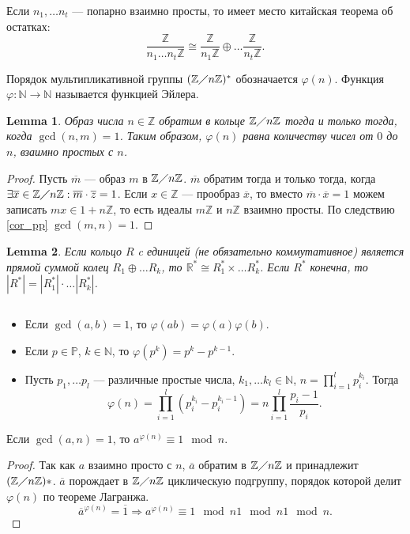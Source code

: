 \documentclass[11pt]{book}
\newcommand{\Z}{\mathbb{Z}}
\newcommand{\N}{\mathbb{N}}
\newcommand{\R}{\mathbb{R}}
\newcommand{\Pm}{\mathbb{P}}
\newcommand{\po}{\diagup}
\theoremstyle{definition}
\theoremstyle{plain}
\theoremstyle{plain}
\newtheorem{lm}{Lemma}
\theoremstyle{definition}
\theoremstyle{remark}
\begin{document}
 Если $ n_1, \ldots n_t$ --- попарно взаимно просты, то имеет место китайская теорема об остатках:
 \[
     \frac{\Z}{n_1 \ldots n_t\Z} \cong \frac{\Z}{n_1\Z} \oplus \ldots \frac{\Z}{n_t\Z}
 .\] 
 \begin{defn}
     Порядок мультипликативной группы $ (\Z \po n\Z)^{*}$ обозначается $ \varphi (n)$. Функция $ \varphi :\N \to  \N$ называется {\sf функцией Эйлера}.
 \end{defn}
 \begin{lm}
     Образ числа $ n \in \Z$ обратим в кольце $ \Z \po n\Z$  тогда и только тогда, когда $ \gcd (n,m) = 1$. Таким образом,  $ \varphi (n)$ равна количеству чисел от $ 0$ до $ n$, взаимно простых с  $ n$.
 \end{lm}
 \begin{proof}
     Пусть $ \overline{m}$ --- образ $ m$ в  $ \Z\po n\Z$. 
      $ \overline{m}$ обратим тогда и только тогда, когда $ \exists \overline{x } \in \Z\po n\Z: \overline{m}\cdot \overline{z} = 1$. 
      Если $ x \in \Z$ --- прообраз $ \overline{x}$, то вместо $ \overline{m} \cdot  \overline{x} = 1$ можем записать $ mx \in  1 + n\Z$, то есть идеалы $ m\Z$ и  $ n\Z$ взаимно просты. По следствию \ref{cor_pp} $ \gcd(m, n) = 1$.
 \end{proof}
 \begin{lm}
     Если кольцо $ R$ c единицей (не обязательно коммутативное) является прямой суммой колец  $ R_1 \oplus \ldots R_k$, то $ \R^{*} \cong R_1^{*} \times \ldots R_k^{*}$. Если $ R^{*}$ конечна, то $ |R^{*}| = |R^{*}_1| \cdot \ldots |R_k^{*}|$.
 \end{lm}
 \begin{thm}
     $ $
     \begin{itemize}[noitemsep]
	 \item 
     Если $ \gcd(a, b) = 1$, то  $ \varphi (ab) = \varphi (a) \varphi (b)$.
 \item Если $ p \in \Pm$, $ k \in \N$, то $ \varphi (p^{k}) = p^{k} - p^{k-1}$.
 \item Пусть  $ p_1, \ldots p_l$ --- различные простые числа, $ k_1, \ldots k_l \in \N$, $ n = \prod_{i = 1}^{l}p_i^{k_i}$. Тогда 
     \[
	 \varphi (n) = \prod_{i=1}^{l}\left(p_{i}^{k_i} - p_i^{k_i -1}\right) =n\prod_{i = 1}^{l}\frac{p_i - 1}{p_i}
     .\] 
     \end{itemize}
 \end{thm}
 \begin{thm}
     Если $ \gcd(a, n) = 1$, то  $ a^{ \varphi (n)} \equiv 1 \mod n$.
 \end{thm}
 \begin{proof}
     Так как $ a$ взаимно просто с  $ n$,  $ \overline{a} $ обратим в $ \Z\po n\Z$ и принадлежит  $ (\Z \po n\Z)*$.  $ \overline{a}$ порождает в $ \Z \po n\Z $ циклическую подгруппу, порядок которой делит  $ \varphi (n)$ по теореме Лагранжа.
     \[
	 \overline{a}^{ \varphi (n)} = \overline{1} \Longrightarrow a^{ \varphi (n)} \equiv 1 \mod n1 \mod n1 \mod n
     .\] 
 \end{proof}
\end{document}
